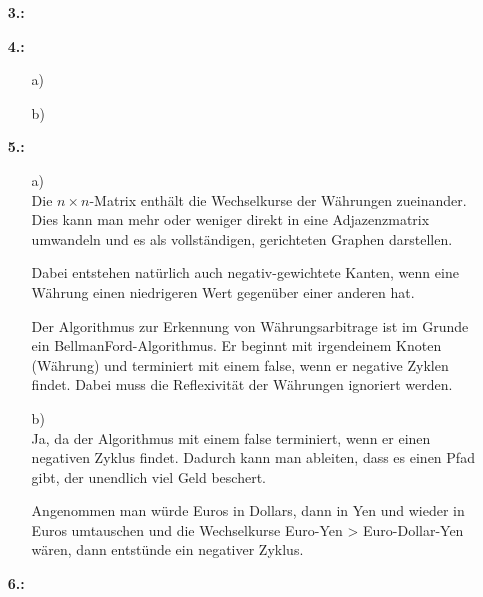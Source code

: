 \documentclass[a4paper,11pt,fleqn]{scrartcl}
\begin{document}
\begin{enumerate}
		\item[\textbf{3.:}] \quad \\
			\todo
		\item[\textbf{4.:}]
		\begin{enumerate}
			\item[a)] \quad \\
				\todo
			\item[b)] \quad \\
				\todo
		\end{enumerate}
		\item[\textbf{5.:}]
		\begin{enumerate}
			\item[a)] \quad \\
			    Die $n \times n$-Matrix enthält die Wechselkurse der Währungen zueinander. Dies kann man mehr oder weniger direkt in eine Adjazenzmatrix umwandeln und es als vollständigen, gerichteten Graphen darstellen.
			    
			    Dabei entstehen natürlich auch negativ-gewichtete Kanten, wenn eine Währung einen niedrigeren Wert gegenüber einer anderen hat.
			    
			    Der Algorithmus zur Erkennung von Währungsarbitrage ist im Grunde ein BellmanFord-Algorithmus. Er beginnt mit irgendeinem Knoten (Währung) und terminiert mit einem false, wenn er negative Zyklen findet. Dabei muss die Reflexivität der Währungen ignoriert werden.
			\item[b)] \quad \\
				Ja, da der Algorithmus mit einem false terminiert, wenn er einen negativen Zyklus findet. Dadurch kann man ableiten, dass es einen Pfad gibt, der unendlich viel Geld beschert.
				
                Angenommen man würde Euros in Dollars, dann in Yen und wieder in Euros umtauschen und die Wechselkurse Euro-Yen > Euro-Dollar-Yen wären, dann entstünde ein negativer Zyklus.
		\end{enumerate}
		\item[\textbf{6.:}] \quad \\
			\todo
	\end{enumerate}
\end{document}
